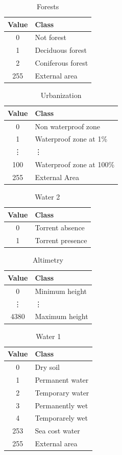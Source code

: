 \documentclass[Lau]{sapthesis} %
\begin{document}
\begin{table}[ht]
\centering
\begin{tabular}{|c|l|}
\hline
\textbf{Value} & \textbf{Class}\\
\hline
0 & Not forest\\
1 & Deciduous forest\\
2 & Coniferous forest\\
255 & External area\\
\hline
\end{tabular}
\caption{Forests}
\label{tab:forest}
\end{table}
%
\begin{table}[ht]
\centering
\begin{tabular}{|c|l|}
\hline
\textbf{Value} & \textbf{Class}\\
\hline
0 & Non waterproof zone\\
1 & Waterproof zone at 1\%\\
\vdots & \vdots\\
100 & Waterproof zone at 100\%\\
255 & External Area\\
\hline
\end{tabular}
\caption{Urbanization}
\label{tab:urbanization}
\end{table}
%
\begin{table}[ht]
\centering
\begin{tabular}{|c|l|}
\hline
\textbf{Value} & \textbf{Class}\\
\hline
0 & Torrent absence\\
1 & Torrent presence\\
\hline
\end{tabular}
\caption{Water 2}
\label{tab:water2}
\end{table}
%
\begin{table}[ht]
\centering
\begin{tabular}{|c|l|}
\hline
\textbf{Value} & \textbf{Class}\\
\hline
0 & Minimum height\\
\vdots & \vdots\\
4380 & Maximum height\\
\hline
\end{tabular}
\caption{Altimetry}
\label{tab:altimetry}
\end{table}
%
\begin{table}[ht]
\centering
\begin{tabular}{|c|l|}
\hline
\textbf{Value} & \textbf{Class}\\
\hline
0 & Dry soil\\
1 & Permanent water\\
2 & Temporary water\\
3 & Permanently wet\\
4 & Temporarely wet\\
253 & Sea cost water\\
255 & External area\\
\hline
\end{tabular}
\caption{Water 1}
\label{tab:water1}
\end{table}


\end{document}
